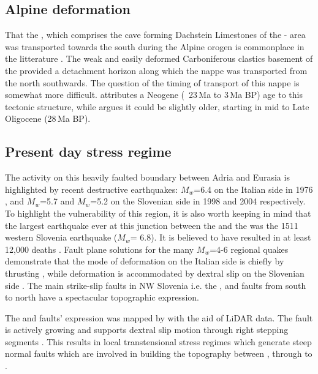 \subsection{Alpine deformation}
\label{par:alpine deformation}
That the , which comprises the cave forming Dachstein Limestones of the - area was transported towards the south during the Alpine orogen is commonplace in the litterature \citep{doglioni1987eoalpine,placer1998contribution}. 
The weak and easily deformed Carboniferous clastics basement of the  provided a detachment horizon along which the nappe was transported from the north southwards. The question of the timing of transport of this nappe is somewhat more difficult. \citet{buser1986tolmavc} attributes a Neogene (~23\,Ma to 3\,Ma BP) age to this tectonic structure, while \citet{placer1998contribution} argues it could be slightly older, starting in mid to Late Oligocene (28\,Ma BP).

\subsection{Present day stress regime}
\label{par:present day stress regime}
The activity on this heavily faulted boundary between Adria and Eurasia is highlighted by recent destructive earthquakes: $M_w$=6.4 on the Italian side in 1976 \citep{pondrelli2001seismotectonic}, and $M_w$=5.7 and $M_w$=5.2 on the Slovenian side in 1998 \citep{bajc20011998} and 2004 \citep{aoudia2005july} respectively. 
To highlight the vulnerability of this region, it is also worth keeping in mind that the largest earthquake ever at this junction between the  and the  was the 1511 western Slovenia earthquake ($M_w$= 6.8). It is believed to have resulted in at least 12,000 deaths \citep{fitzko2005constraints}.
Fault plane solutions for the many $M_w$=4-6 regional quakes demonstrate that the mode of deformation on the Italian side is chiefly by thrusting \citep{poli2002new}, while deformation is accommodated by dextral slip on the Slovenian side \citep{poljak2000seismotectonic}. 
The main strike-slip faults in NW Slovenia i.e. the ,  and  faults from south to north have a spectacular topographic expression. 

The  and  faults' expression was mapped by \citet{cunningham2006application} with the aid of LiDAR data. The  fault is actively growing and supports dextral slip motion through right stepping segments \citep{kastelic2008neo}.
This results in local transtensional stress regimes which generate steep normal faults which are involved in building the topography between , through to . 


